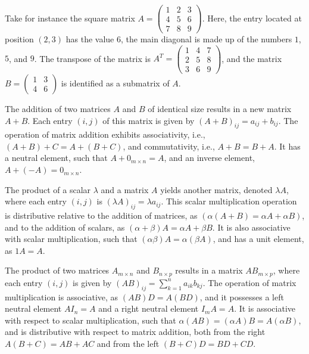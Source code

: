\begin{example}
Take for instance the square matrix $A = \left( \begin{smallmatrix} 1 & 2 & 3 \\ 4 & 5 & 6 \\ 7 & 8 & 9 \end{smallmatrix} \right)$. Here, the entry located at position $(2, 3)$ has the value $6$, the main diagonal is made up of the numbers $1$, $5$, and $9$. The transpose of the matrix is $A^T = \left( \begin{smallmatrix} 1 & 4 & 7 \\ 2 & 5 & 8 \\ 3 & 6 & 9 \end{smallmatrix} \right)$, and the matrix $B = \left( \begin{smallmatrix} 1 & 3 \\ 4 & 6 \end{smallmatrix} \right)$ is identified as a submatrix of $A$.
\end{example}

The addition of two matrices $A$ and $B$ of identical size results in a new matrix $A + B$. Each entry $(i, j)$ of this matrix is given by $(A + B)_{ij} = a_{ij} + b_{ij}$. The operation of matrix addition exhibits associativity, i.e., $(A + B) + C = A + (B + C)$, and commutativity, i.e., $A + B = B + A$. It has a neutral element, such that $A + 0_{m \times n} = A$, and an inverse element, $A + (-A) = 0_{m \times n}$.

The product of a scalar $\lambda$ and a matrix $A$ yields another matrix, denoted $\lambda A$, where each entry $(i, j)$ is $(\lambda A)_{ij} = \lambda a_{ij}$. This scalar multiplication operation is distributive relative to the addition of matrices, as $(\alpha (A + B) = \alpha A + \alpha B)$, and to the addition of scalars, as $(\alpha + \beta) A = \alpha A + \beta B$. It is also associative with scalar multiplication, such that $(\alpha \beta) A = \alpha (\beta A)$, and has a unit element, as $1 A = A$.

The product of two matrices $A_{m \times n}$ and $B_{n \times p}$ results in a matrix $AB_{m \times p}$, where each entry $(i, j)$ is given by $(AB)_{ij} = \sum_{k=1}^n a_{ik} b_{kj}$. The operation of matrix multiplication is associative, as $(A B) D = A (B D)$, and it possesses a left neutral element $A I_n = A$ and a right neutral element $I_m A = A$. It is associative with respect to scalar multiplication, such that $\alpha (A B) = (\alpha A) B = A (\alpha B)$, and is distributive with respect to matrix addition, both from the right $A (B + C) = AB + AC$ and from the left $(B + C) D = B D + C D$. 

